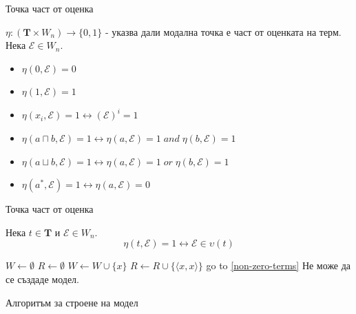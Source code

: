 \documentclass[14pt, aspectratio=169]{beamer}
\renewcommand\thealgorithm{}
\newcommand\E{\mathcal{E}}
\newcommand\Tb{\mathbf{T}}
\newcommand{\pair}[2]{ \langle #1, #2 \rangle }
\newcommand{\pairXX}{ \pair{x}{x} }
\def\iff{\leftrightarrow}
\begin{document}
\begin{frame}{Точка част от оценка}
		\begin{definition}[$\eta$]
			$\eta: (\Tb \times W_n) \rightarrow \{0, 1 \}$ - указва дали модална точка е част от оценката на терм. Нека $\E \in W_n$.
			\begin{itemize}
				\item $\eta(0, \E) = 0$
				\item $\eta(1, \E) = 1$
				\item $\eta(x_i, \E) = 1 \iff (\E)^i = 1$
				\item $\eta(a \sqcap b, \E) = 1 \iff \eta(a, \E) = 1 \; and \; \eta(b, \E) = 1$
				\item $\eta(a \sqcup b, \E) = 1 \iff \eta(a, \E) = 1 \; or \; \eta(b, \E) = 1$
				\item $\eta(a^*, \E) = 1 \iff \eta(a, \E) = 0$
			\end{itemize}
		\end{definition}
\end{frame}

\begin{frame}{Точка част от оценка}
	\begin{lemma}
		Нека $t \in \Tb$ и $\E \in W_n$.
		\begin{equation*}
			\eta(t, \E) = 1 \iff \E \in \upsilon(t)
		\end{equation*}
	\end{lemma}
\end{frame}

\begin{frame}
	\begin{algorithm}[H]
	\renewcommand\thealgorithm{} %
	\begin{algorithmic}[1] %
		\STATE $W \gets \emptyset$
		\STATE $R \gets \emptyset$
		 \label{non-zero-terms}
			\FOR{$\E \in W^v$}
				\IF{$\eta(d, \E) = 1$}
					\STATE $W \gets W \cup \{ x \}$
					\STATE $R \gets R \cup \{ \pairXX \}$
					\STATE go to \ref{non-zero-terms}
				\ENDIF
			\ENDFOR
			\STATE Не може да се създаде модел.
		\ENDFOR
	\end{algorithmic}

	\caption{Алгоритъм за строене на модел}
	\label{alg:seq}
	\end{algorithm}
\end{frame}
\end{document}
